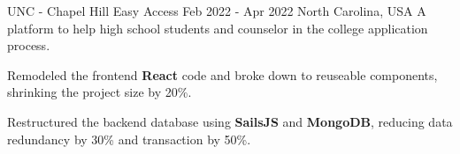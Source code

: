 \begin{cventries}
  \cventry
  {UNC - Chapel Hill} %
  {Easy Access} %
  {Feb 2022 - Apr 2022} %
  {North Carolina, USA} %
  {A platform to help high school students and counselor in the college application process.}
  {
    \begin{cvitems} %
      \item {Remodeled the frontend \textbf{React} code and broke down to reuseable components, shrinking the project size by 20\%.}
      \item {Restructured the backend database using \textbf{SailsJS} and \textbf{MongoDB}, reducing data redundancy by 30\% and transaction by 50\%.}
    \end{cvitems}
  }



\end{cventries}
